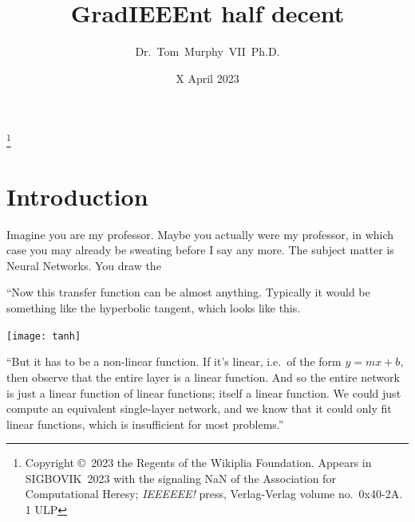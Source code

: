 \documentclass[twocolumn]{article}
\begin{document}
\title{GradIEEEnt half decent}
\author{Dr.~Tom~Murphy~VII~Ph.D.}\thanks{
Copyright \copyright\ 2023 the Regents of the Wikiplia Foundation.
Appears in SIGBOVIK~2023 with the
signaling NaN
of the Association for Computational Heresy; {\em IEEEEEE!}
press, Verlag-Verlag volume no.~0x40-2A. 1 ULP
}

\renewcommand\th{\ensuremath{{}^{\textrm{th}}}}
\newcommand\st{\ensuremath{{}^{\textrm{st}}}}
\newcommand\rd{\ensuremath{{}^{\textrm{rd}}}}
\newcommand\nd{\ensuremath{{}^{\textrm{nd}}}}

\newcommand\gradone{{\sf grad1}}
\newcommand\downshifttwo{{\sf downshift2}}
\newcommand\plussixtyfour{{\sf plus64}}

\renewcommand\paragraph[1]{\smallskip \noindent{\bf #1}\enspace}

\date{X April 2023}

\maketitle \thispagestyle{empty}

\sloppypar


\section{Introduction}



Imagine you are my professor. Maybe you actually were my professor, in
which case you may already be sweating before I say any more. The
subject matter is Neural Networks. You draw the

``Now this transfer function can be almost anything. Typically it
would be something like the hyperbolic tangent, which looks like this.

\begin{center}
\texttt{[image: tanh]}
\end{center}

``But it has to be a non-linear function. If it's linear, i.e.~of the
form $y = mx + b$, then observe that the entire layer is a linear
function. And so the entire network is just a linear function of
linear functions; itself a linear function. We could just compute an
equivalent single-layer network, and we know that it could only fit
linear functions, which is insufficient for most problems.''
\end{document}
